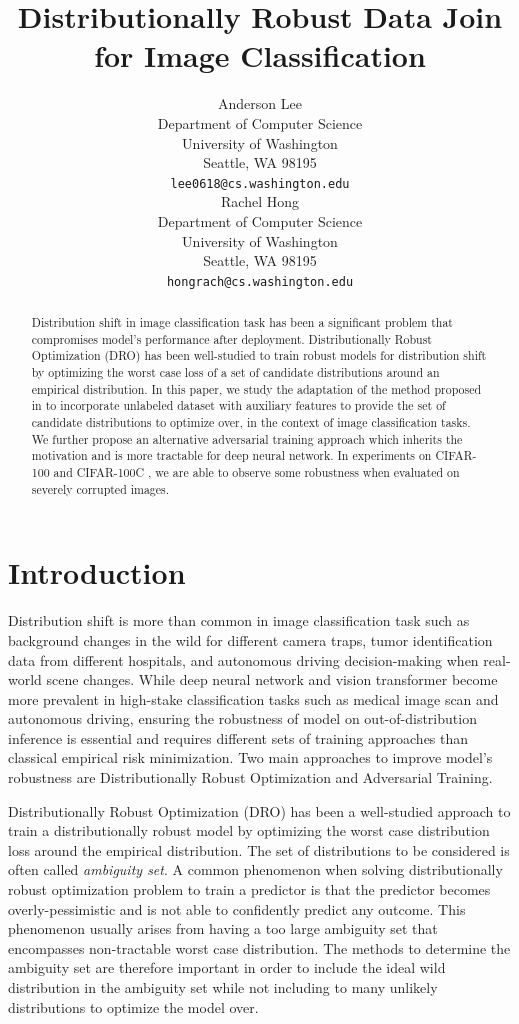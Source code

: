 \documentclass{article}
\title{Distributionally Robust Data Join for Image Classification}
\author{%
  Anderson Lee \\
  Department of Computer Science \\
  University of Washington \\
  Seattle, WA 98195 \\
  \texttt{lee0618@cs.washington.edu} \\
  \And
  Rachel Hong \\
  Department of Computer Science \\
  University of Washington \\
  Seattle, WA 98195 \\
  \texttt{hongrach@cs.washington.edu} \\
}
\begin{document}
\maketitle

\begin{abstract}
  Distribution shift in image classification task has been a significant problem
  that compromises model's performance after deployment. Distributionally Robust
  Optimization (DRO) has been well-studied to train robust models for distribution shift by optimizing
  the worst case loss of a set of candidate distributions around an empirical
  distribution. In this paper, we study the adaptation of the method proposed 
  in \citep{awasthi2022distributionally} to incorporate unlabeled dataset with 
  auxiliary features to provide the set of candidate distributions to 
  optimize over, in the context of image classification tasks. We further 
  propose an alternative adversarial training approach which inherits the 
  motivation and is more tractable for deep neural network. In experiments on 
  CIFAR-100 and CIFAR-100C \citep{hendrycks2019robustness}, we are able to 
  observe some robustness when evaluated on severely corrupted images.
\end{abstract}

\section{Introduction}
Distribution shift is more than common in image classification task such as 
background changes in the wild for different camera traps, tumor identification
data from different hospitals, and autonomous driving decision-making 
when real-world scene changes. \citep{yao2022wild,malinin2021shifts} 
While deep neural network and vision transformer 
become more prevalent in high-stake classification tasks such as medical image scan 
and autonomous driving, ensuring the robustness of model on out-of-distribution 
inference is essential and requires different sets of training approaches 
than classical empirical risk minimization. Two main approaches to improve model's
robustness are Distributionally Robust Optimization and Adversarial Training.

Distributionally Robust Optimization (DRO) has been a well-studied approach 
to train a distributionally robust model by optimizing the worst case distribution
loss around the empirical distribution. \citep{rahimian2019distributionally} The set 
of distributions to be considered is often called \textit{ambiguity set}. A common 
phenomenon when solving distributionally robust optimization problem to train 
a predictor is that the predictor becomes overly-pessimistic and is not able 
to confidently predict any outcome. This phenomenon usually arises from having 
a too large ambiguity set that encompasses non-tractable worst case distribution.
The methods to determine the ambiguity set are therefore important in order 
to include the ideal wild distribution in the ambiguity set while not including 
to many unlikely distributions to optimize the model over. 
\end{document}
